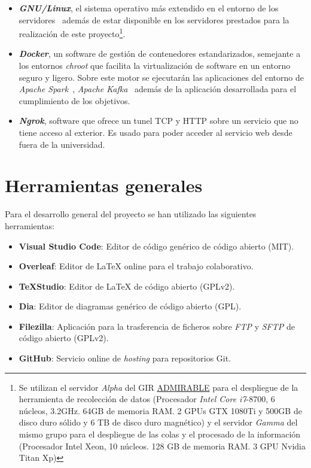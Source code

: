 \begin{itemize}
	\item \textit{\textbf{GNU/Linux}}, el sistema operativo más extendido en el entorno de los servidores~\cite{noauthorred2018, zhang2000linux} además de estar disponible en los servidores prestados para la realización de este proyecto\footnote{Se utilizan el servidor \textit{Alpha} del GIR \href{https://admirable-ubu.es/}{ADMIRABLE} para el despliegue de la herramienta de recolección de datos (Procesador \textit{Intel Core i7}-8700, 6 núcleos, 3.2GHz. 64GB de memoria RAM. 2 GPUs GTX 1080Ti y 500GB de disco duro sólido y 6 TB de disco duro magnético) y el servidor \textit{Gamma} del mismo grupo para el despliegue de las colas y el procesado de la información (Procesador Intel Xeon, 10 núcleos. 128 GB de memoria RAM. 3 GPU Nvidia Titan Xp)}.
	\item \textit{\textbf{Docker}}, un software de gestión de contenedores estandarizados, semejante a los entornos \textit{chroot} que facilita la virtualización de software en un entorno seguro y ligero. Sobre este motor se ejecutarán las aplicaciones del entorno de \textit{Apache Spark}~\cite{juez2019docker}, \textit{Apache Kafka}~\cite{confluentic2020docker} además de la aplicación desarrollada para el cumplimiento de los objetivos.
	\item \textit{\textbf{Ngrok}}, software que ofrece un tunel TCP y HTTP sobre un servicio que no tiene acceso al exterior. Es usado para poder acceder al servicio web desde fuera de la universidad.
\end{itemize}

\section{Herramientas generales}\label{sec:herramientasgenerales}

Para el desarrollo general del proyecto se han utilizado las siguientes herramientas:

\begin{itemize}
	\item \textbf{Visual Studio Code}: Editor de código genérico de código abierto (MIT).
	\item \textbf{Overleaf}: Editor de \LaTeX{} online para el trabajo colaborativo.
	\item \textbf{\TeX{}Studio}: Editor de \LaTeX{} de código abierto (GPLv2).
    \item \textbf{Dia}: Editor de diagramas genérico de código abierto (GPL).
    \item \textbf{Filezilla}: Aplicación para la trasferencia de ficheros sobre \textit{FTP} y \textit{SFTP} de código abierto (GPLv2).
    \item \textbf{GitHub}: Servicio online de \textit{hosting} para repositorios Git.
\end{itemize}
